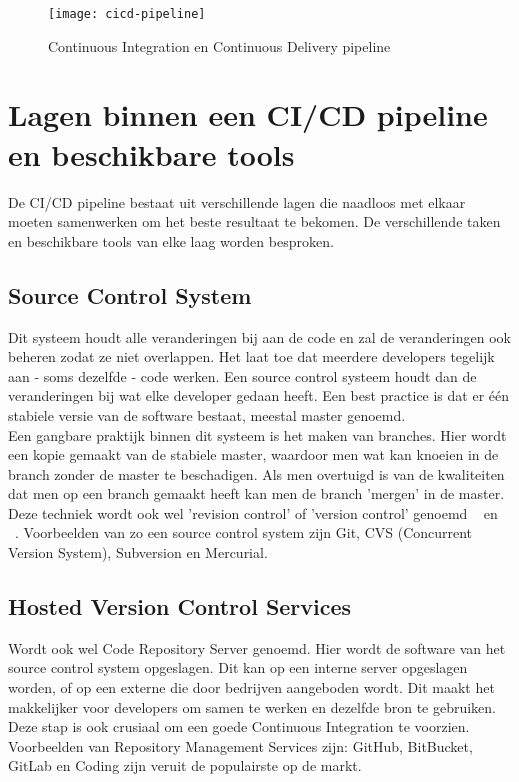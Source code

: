     \begin{figure}	
        \texttt{[image: cicd-pipeline]}
        \caption{Continuous Integration en Continuous Delivery pipeline ~\autocite{Tuli2018}} \label{cicd-pipeline}
    \end{figure}
    
    \section{Lagen binnen een CI/CD pipeline en beschikbare tools}
    De CI/CD pipeline bestaat uit verschillende lagen die naadloos met elkaar moeten samenwerken om het beste resultaat te bekomen. De verschillende taken en beschikbare tools van elke laag worden besproken.
    
        \subsection{Source Control System}
        \label{subsec:source-control-systeem}
        Dit systeem houdt alle veranderingen bij aan de code en zal de veranderingen ook beheren zodat ze niet overlappen. Het laat toe dat meerdere developers tegelijk aan - soms dezelfde - code werken. Een source control systeem houdt dan de veranderingen bij wat elke developer gedaan heeft. Een best practice is dat er één stabiele versie van de software bestaat, meestal master genoemd.\\
        Een gangbare praktijk binnen dit systeem is het maken van branches. Hier wordt een kopie gemaakt van de stabiele master, waardoor men wat kan knoeien in de branch zonder de master te beschadigen. Als men overtuigd is van de kwaliteiten dat men op een branch gemaakt heeft kan men de branch 'mergen' in de master. Deze techniek wordt ook wel 'revision control' of 'version control' genoemd ~\autocite{Skelton2014} en ~\autocite{Riti2018}.
        Voorbeelden van zo een source control system zijn Git, CVS (Concurrent Version System), Subversion en Mercurial.
        
        \subsection{Hosted Version Control Services}
        Wordt ook wel Code Repository Server genoemd. Hier wordt de software van het source control system opgeslagen. Dit kan op een interne server opgeslagen worden, of op een externe die door bedrijven aangeboden wordt. Dit maakt het makkelijker voor developers om samen te werken en dezelfde bron te gebruiken. Deze stap is ook crusiaal om een goede Continuous Integration te voorzien.
        Voorbeelden van Repository Management Services zijn: GitHub, BitBucket, GitLab en Coding zijn veruit de populairste op de markt.
        
